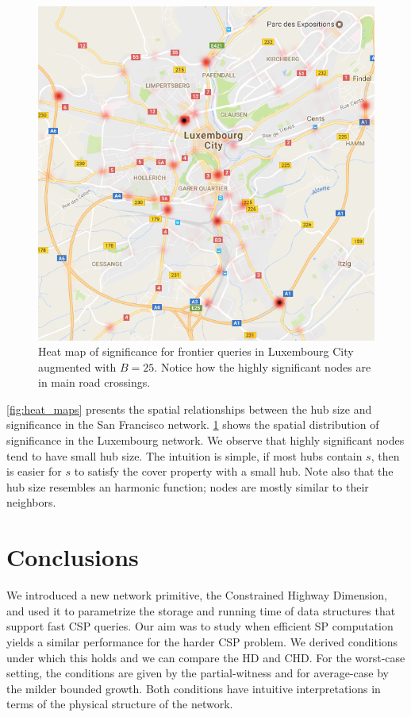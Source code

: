 \documentclass[opre,nonblindrev]{informs3} %
\begin{document}
\begin{figure}
\centering
\includegraphics[scale=0.3]{TexImg/map_LU_sig.png}
\caption{Heat map of significance for frontier queries in Luxembourg City augmented with $B=25$.
Notice how the highly significant nodes are in main road crossings.}
\label{fig:map_LU} 
\end{figure}

\cref{fig:heat_maps} presents the spatial relationships between the hub size and significance in the San Francisco network. 
\cref{fig:map_LU} shows the spatial distribution of significance in the Luxembourg network.
We observe that highly significant nodes tend to have small hub size.
The intuition is simple, if most hubs contain $s$, then is easier for $s$ to satisfy the cover property with a small hub.
Note also that the hub size resembles an harmonic function; nodes are mostly similar to their neighbors.


\section{Conclusions}
\label{sec:conclu}
We introduced a new network primitive, the Constrained Highway Dimension, and used it to parametrize the storage and running time of data structures that support fast CSP queries.
Our aim was to study when efficient SP computation yields a similar performance for the harder CSP problem.
We derived conditions under which this holds and we can compare the HD and CHD.
For the worst-case setting, the conditions are given by the partial-witness and for average-case by the milder bounded growth. 
Both conditions have intuitive interpretations in terms of the physical structure of the network. 
\end{document}
